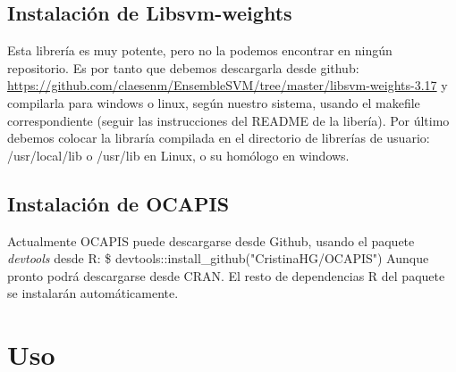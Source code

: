 \subsection{Instalación de Libsvm-weights}
Esta librería es muy potente, pero no la podemos encontrar en ningún repositorio. Es por tanto que debemos descargarla desde github: \url{https://github.com/claesenm/EnsembleSVM/tree/master/libsvm-weights-3.17} y compilarla para windows o linux, según nuestro sistema, usando el makefile correspondiente (seguir las instrucciones del README de la libería). \newline
Por último debemos colocar la libraría compilada en el directorio de librerías de usuario: \textcolor{SchoolColor}{/usr/local/lib} o \textcolor{SchoolColor}{/usr/lib} en Linux, o su homólogo en windows. 

\subsection{Instalación de OCAPIS}
Actualmente OCAPIS puede descargarse desde Github, usando el paquete \textit{devtools} desde R:
\vspace{3pt}
\hline
\vspace{7pt}
\$ devtools::install\_github("CristinaHG/OCAPIS")
\vspace{7pt}
\hline
\vspace{3pt}\newline
Aunque pronto podrá descargarse desde CRAN. El resto de dependencias R del paquete se instalarán automáticamente.
\section{Uso}
